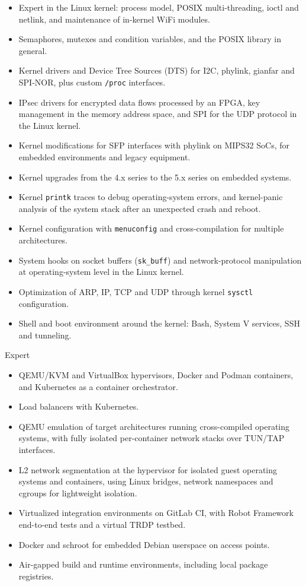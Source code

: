\documentclass[11pt,a4paper]{article}
\newcommand{\cvskill}[2]{%
  \Needspace{5\baselineskip}%
  \noindent{\bfseries\color{cvblue} #1}\hfill{\color{cvaccent} #2}\par
  \nopagebreak
}
\begin{document}
\begin{itemize}
  \item Expert in the Linux kernel: process model, POSIX multi-threading, ioctl and netlink, and maintenance of in-kernel WiFi modules.
  \item Semaphores, mutexes and condition variables, and the POSIX library in general.
  \item Kernel drivers and Device Tree Sources (DTS) for I2C, phylink, gianfar and SPI-NOR, plus custom \texttt{/proc} interfaces.
  \item IPsec drivers for encrypted data flows processed by an FPGA, key management in the memory address space, and SPI for the UDP protocol in the Linux kernel.
  \item Kernel modifications for SFP interfaces with phylink on MIPS32 SoCs, for embedded environments and legacy equipment.
  \item Kernel upgrades from the 4.x series to the 5.x series on embedded systems.
  \item Kernel \texttt{printk} traces to debug operating-system errors, and kernel-panic analysis of the system stack after an unexpected crash and reboot.
  \item Kernel configuration with \texttt{menuconfig} and cross-compilation for multiple architectures.
  \item System hooks on socket buffers (\texttt{sk\_buff}) and network-protocol manipulation at operating-system level in the Linux kernel.
  \item Optimization of ARP, IP, TCP and UDP through kernel \texttt{sysctl} configuration.
  \item Shell and boot environment around the kernel: Bash, System V services, SSH and tunneling.
\end{itemize}

\cvskill{Virtualization}{Expert}

\begin{itemize}
  \item QEMU/KVM and VirtualBox hypervisors, Docker and Podman containers, and Kubernetes as a container orchestrator.
  \item Load balancers with Kubernetes.
  \item QEMU emulation of target architectures running cross-compiled operating systems, with fully isolated per-container network stacks over TUN/TAP interfaces.
  \item L2 network segmentation at the hypervisor for isolated guest operating systems and containers, using Linux bridges, network namespaces and cgroups for lightweight isolation.
  \item Virtualized integration environments on GitLab CI, with Robot Framework end-to-end tests and a virtual TRDP testbed.
  \item Docker and schroot for embedded Debian userspace on access points.
  \item Air-gapped build and runtime environments, including local package registries.
\end{itemize}
\end{document}
